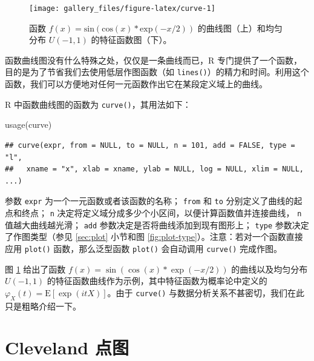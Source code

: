 \documentclass[
  b5paper,
  UTF8,twoside]{book}
\newenvironment{Shaded}{\begin{snugshade}}{\end{snugshade}}
\newcommand{\FunctionTok}[1]{\textcolor[rgb]{0.00,0.00,0.00}{#1}}
\newcommand{\NormalTok}[1]{#1}
\begin{document}
\begin{figure}

{\centering \texttt{[image: gallery\_files/figure-latex/curve-1]} 

}

\caption[函数 \(f(x)=\mathrm{sin}(\mathrm{cos}(x)*\mathrm{exp}(-x/2))\) 的曲线图]{函数 \(f(x)=\mathrm{sin}(\mathrm{cos}(x)*\mathrm{exp}(-x/2))\) 的曲线图（上）和均匀分布 \(U(-1,1)\) 的特征函数图（下）。}\label{fig:curve}
\end{figure}

函数曲线图没有什么特殊之处，仅仅是一条曲线而已，R 专门提供了一个函数，目的是为了节省我们去使用低层作图函数（如 \texttt{lines()}）的精力和时间。利用这个函数，我们可以方便地对任何一元函数作出它在某段定义域上的曲线。

R 中函数曲线图的函数为 \texttt{curve()}，其用法如下：

\begin{Shaded}
\begin{Highlighting}[]
\FunctionTok{usage}\NormalTok{(curve)}
\end{Highlighting}
\end{Shaded}

\begin{verbatim}
## curve(expr, from = NULL, to = NULL, n = 101, add = FALSE, type = "l",
##   xname = "x", xlab = xname, ylab = NULL, log = NULL, xlim = NULL, ...)
\end{verbatim}

参数 \texttt{expr} 为一个一元函数或者该函数的名称； \texttt{from} 和 \texttt{to} 分别定义了曲线的起点和终点； \texttt{n} 决定将定义域分成多少个小区间，以便计算函数值并连接曲线， \texttt{n} 值越大曲线越光滑； \texttt{add} 参数决定是否将曲线添加到现有图形上； \texttt{type} 参数决定了作图类型（参见 \ref{sec:plot} 小节和图 \ref{fig:plot-type}）。注意：若对一个函数直接应用 \texttt{plot()} 函数，那么泛型函数 \texttt{plot()} 会自动调用 \texttt{curve()} 完成作图。

图 \ref{fig:curve} 给出了函数 \(f(x)=\sin(\cos(x)*\exp(-x/2))\) 的曲线以及均匀分布 \(U(-1,1)\) 的特征函数曲线作为示例，其中特征函数为概率论中定义的 \(\varphi_{X}(t) = \mathrm{E}[\exp(itX)]\)。由于 \texttt{curve()} 与数据分析关系不甚密切，我们在此只是粗略介绍一下。

\hypertarget{sec:dotchart}{%
\section{Cleveland 点图}\label{sec:dotchart}}
\end{document}
